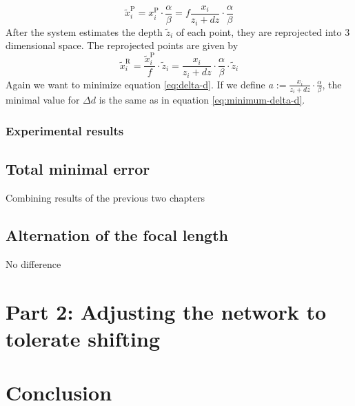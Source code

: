 \documentclass[11pt]{article}
\begin{document}
	\begin{equation}
			\widetilde{x}_i^\mathrm{P} = x_i^\mathrm{P} \cdot \frac{\alpha}{\beta} 
			= f \frac{x_i}{z_i + dz}\cdot \frac{\alpha}{\beta} 
	\end{equation}
	After the system estimates the depth $\widetilde{z}_i$ of each point, they are reprojected into 3 dimensional space.
	The reprojected points are given by
	\begin{equation}
		\widetilde{x}_i^\mathrm{R} = \frac{\widetilde{x}_i^\mathrm{P}}{f} \cdot \widetilde{z}_i
		= \frac{x_i}{z_i + dz}\cdot \frac{\alpha}{\beta}  \cdot \widetilde{z}_i
	\end{equation}
	Again we want to minimize equation \eqref{eq:delta-d}.
	If we define $a := \frac{x_i}{z_i + dz}\cdot \frac{\alpha}{\beta}$, the minimal value for $\Delta d$ is the same as in equation \eqref{eq:minimum-delta-d}.
	
	
	\subsubsection{Experimental results}
	
	\subsection{Total minimal error}
	
	Combining results of the previous two chapters
	
	\subsection{Alternation of the focal length}
	No difference
	
	
	\section{Part 2: Adjusting the network to tolerate shifting}
	\label{sec:network-adjusting}
	\section{Conclusion}
	\newpage
	
	
	
\end{document}
